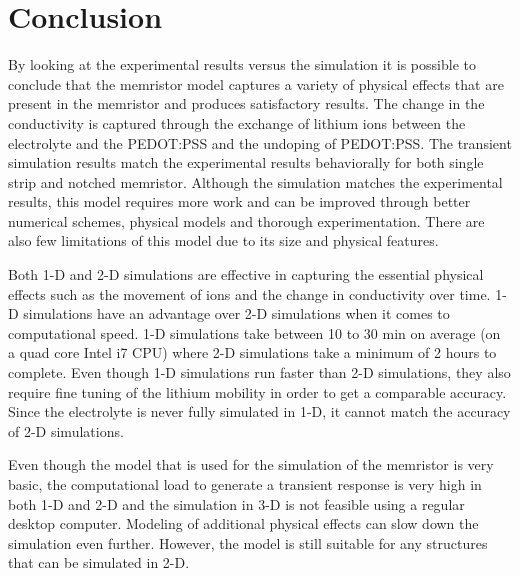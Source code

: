 
\chapter{Conclusion} %

\label{Chapter7} %


\begin{doublespace}

By looking at the experimental results versus the simulation it is possible to conclude that the memristor model captures a variety of physical effects that are present in the memristor and produces satisfactory results. The change in the conductivity is captured through the exchange of lithium ions between the electrolyte and the PEDOT:PSS and the undoping of PEDOT:PSS. The transient simulation results match the experimental results behaviorally for both single strip and notched memristor. Although the simulation matches the experimental results, this model requires more work and can be improved through better numerical schemes, physical models and thorough experimentation. There are also few limitations of this model due to its size and physical features.

Both 1-D and 2-D simulations are effective in capturing the essential physical effects such as the movement of ions and the change in conductivity over time. 1-D simulations have an advantage over 2-D simulations when it comes to computational speed. 1-D simulations take between 10 to 30 min on average (on a quad core Intel i7 CPU) where 2-D simulations take a minimum of 2 hours to complete. Even though 1-D simulations run faster than 2-D simulations, they also require fine tuning of the lithium mobility in order to get a comparable accuracy. Since the electrolyte is never fully simulated in 1-D, it cannot match the accuracy of 2-D simulations.

Even though the model that is used for the simulation of the memristor is very basic, the computational load to generate a transient response is very high in both 1-D and 2-D and the simulation in 3-D is not feasible using a regular desktop computer. Modeling of additional physical effects can slow down the simulation even further. However, the model is still suitable for any structures that can be simulated in 2-D.  


\end{doublespace}
